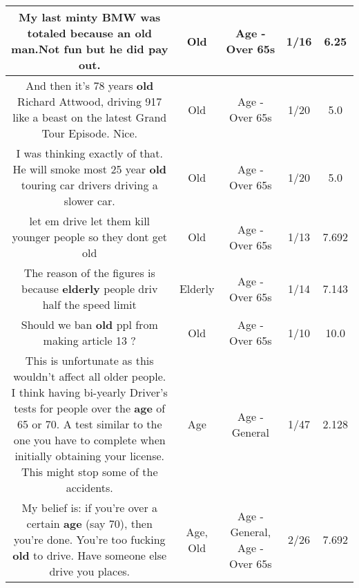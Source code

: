 \documentclass[11pt]{article}
\newlength\mylength
\begin{document}
\begin{center}
\begin{longtable}{|C{.65\mylength}|C{.30\mylength}|C{.12\mylength}|C{.12\mylength}|C{.12\mylength}|}
  \small My last minty BMW was totaled because an \textbf{old} man.Not fun but he did pay out.\normalsize   & Old & Age - Over 65s & 1/16 & 6.25 \\  \hline
  \small And then it's 78 years \textbf{old} Richard Attwood, driving 917 like a beast on the latest Grand Tour Episode. Nice.\normalsize   & Old & Age - Over 65s & 1/20 & 5.0 \\  \hline
  \small I was thinking exactly of that. He will smoke most 25 year \textbf{old} touring car drivers driving a slower car.\normalsize   & Old & Age - Over 65s & 1/20 & 5.0 \\  \hline
  \small let em drive let them kill younger people so they dont get old\normalsize   & Old & Age - Over 65s & 1/13 & 7.692 \\  \hline
  \small The reason of the figures is because \textbf{elderly} people driv half the speed limit\normalsize   & Elderly & Age - Over 65s & 1/14 & 7.143 \\  \hline
  \small Should we ban \textbf{old} ppl from making article 13 ?\normalsize   & Old & Age - Over 65s & 1/10 & 10.0 \\  \hline
  \small This is unfortunate as this wouldn't affect all older people. I think having bi-yearly Driver's tests for people over the \textbf{age} of 65 or 70. A test similar to the one you have to complete when initially obtaining your license. This might stop some of the accidents.\normalsize   & Age & Age - General & 1/47 & 2.128 \\  \hline
  \small My belief is: if you're over a certain \textbf{age} (say 70), then you're done. You're too fucking \textbf{old} to drive. Have someone else drive you places.\normalsize   & Age, Old & Age - General, Age - Over 65s & 2/26 & 7.692 \\  \hline

\end{longtable}
\end{center}
\end{document}
